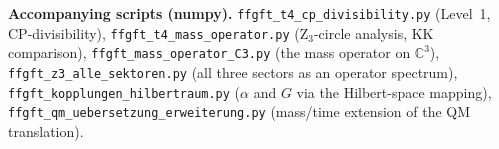 \bigskip
\noindent\textbf{Accompanying scripts (numpy).}
\texttt{ffgft\_t4\_cp\_divisibility.py} (Level~1, CP-divisibility),
\texttt{ffgft\_t4\_mass\_operator.py} (Z$_3$-circle analysis, KK comparison),
\texttt{ffgft\_mass\_operator\_C3.py} (the mass operator on $\mathbb{C}^3$),
\texttt{ffgft\_z3\_alle\_sektoren.py} (all three sectors as an operator spectrum),
\texttt{ffgft\_kopplungen\_hilbertraum.py} ($\alpha$ and $G$ via the Hilbert-space
mapping),
\texttt{ffgft\_qm\_uebersetzung\_erweiterung.py} (mass/time extension of the QM
translation).
